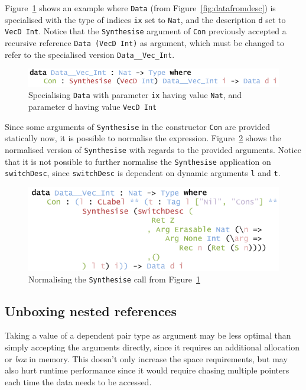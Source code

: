 \documentclass{ituthesis}
\newcommand{\ttconstructor}[1]{\textcolor{constructor-color}{\texttt{#1}}}
\newcommand{\tttype}[1]{\textcolor{type-color}{\texttt{#1}}}
\newcommand{\ttdec}[1]{\textcolor{declared-var-color}{\texttt{#1}}}
\newcommand{\ttvar}[1]{\textcolor{local-var-color}{\texttt{#1}}}
\theoremstyle{break}
\begin{document}
Figure~\ref{fig:pesp} shows an example where \tttype{Data} (from Figure~\ref{fig:datafromdesc}) is specialised with the type of indices \ttvar{ix} set to \tttype{Nat},
and the description \ttvar{d} set to \ttdec{VecD}~\tttype{Int}.
Notice that the \ttdec{Synthesise} argument of \ttvar{Con} previously accepted a recursive reference \tttype{Data}~\texttt{(}\ttdec{VecD}~\tttype{Int}\texttt{)} as argument,
which must be changed to refer to the specialised version \tttype{Data\_\_Vec\_Int}.

\begin{figure}[ht]
\begin{center}
    \includegraphics[scale=0.5]{Figures/PESpecialising.png}
\end{center}
\caption{Specialising \tttype{Data} with parameter \ttvar{ix} having value \tttype{Nat}, and parameter \ttvar{d} having value \ttdec{VecD}~\tttype{Int}}
\label{fig:pesp}
\end{figure}

Since some arguments of \ttdec{Synthesise} in the constructor \ttconstructor{Con} are provided statically now, it is possible to normalise the expression.
Figure~\ref{fig:pespext} shows the normalised version of \ttdec{Synthesise} with regards to the provided arguments.
Notice that it is not possible to further normalise the \ttdec{Synthesise} application on \ttdec{switchDesc}, since \ttdec{switchDesc} is dependent on dynamic arguments \ttvar{l} and \ttvar{t}.

\begin{figure}[ht]
\begin{center}
    \includegraphics[scale=0.5]{Figures/PESpecialisingExpansion.png}
\end{center}
\caption{Normalising the \ttdec{Synthesise} call from Figure~\ref{fig:pesp}}
\label{fig:pespext}
\end{figure}

\subsection{Unboxing nested references}
\label{sub:Unboxingnestedreferences}
Taking a value of a dependent pair type as argument may be less optimal than simply accepting the arguments directly,
since it requires an additional allocation or \textit{box} in memory.
This doesn't only increase the space requirements, but may also hurt runtime performance since it would require chasing multiple pointers each time the data needs to be accessed.
\end{document}
